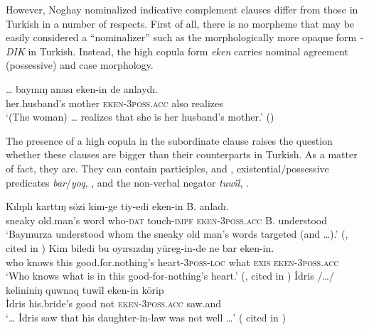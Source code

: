 \documentclass[output=paper]{langsci/langscibook}
\begin{document}
However, Noghay nominalized indicative complement clauses differ from those in Turkish in a number of respects. 
First of all, there is no morpheme that may be easily considered a ``nominalizer'' such as the morphologically more opaque form \textit{-DIK} in Turkish. 
Instead, the high copula form \textit{eken} carries nominal agreement (possessive) and case morphology. 

\ea %
    \label{kelepirex:key:17}
    \gll \ldots{} bayınıŋ anası eken-in de anlaydı. \\
    {} her.husband's mother \textsc{eken}-3\textsc{poss}.\textsc{acc} also realizes \\
    \glt `(The woman) \ldots{} realizes that she is her husband's mother.' (\citealp[343]{Karakoc2007})
\z 

The presence of a high copula in the subordinate clause raises the question whether these clauses are bigger than their counterparts in Turkish. 
As a matter of fact, they are. 
They can contain participles,  and , existential/possessive predicates \textit{bar}/\textit{yoq}, , and the non-verbal negator \textit{tuwïl}, . 

\ea %
    \label{kelepirex:key:18}
    \gll Kılıplı karttıŋ sözi kim-ge tiy-edi eken-in B. anladı. \\
    sneaky old.man's word who-\textsc{dat} touch-\textsc{impf} \textsc{eken}-\textsc{3poss.acc} B. understood \\
    \glt `Baymurza understood whom the sneaky old man's words targeted (and \ldots{}).' (\citealp[126]{DjanbidaevaOgurlieva1995}, cited in \citealp[353]{Karakoc2007})
\ex %
    \label{kelepirex:key:19}
    \gll Kim biledi bu oyırsızdıŋ yüreg-in-de ne bar eken-in.\\
    who knows this good.for.nothing's heart-\textsc{3poss}-\textsc{loc} what \textsc{exis} \textsc{eken}-\textsc{3poss}.\textsc{acc} \\
    \glt `Who knows what is in this good-for-nothing's heart.' (\citealp[55]{DjanbidaevaOgurlieva1995}, cited in \citealp[344]{Karakoc2007})
\ex %
    \label{kelepirex:key:20}
    \gll İdris /\ldots{}/ kelininiŋ  quwnaq tuwïl eken-in körip \\
    İdris     his.bride's  good      not   \textsc{eken}-\textsc{3poss}.\textsc{acc} saw.and \\
    \glt `\ldots{} İdris saw that his daughter-in-law was not well \ldots{}' (\citealp[159]{Kapaev1962} cited in \citealp[33]{Karakoc2001})
\z
\end{document}
